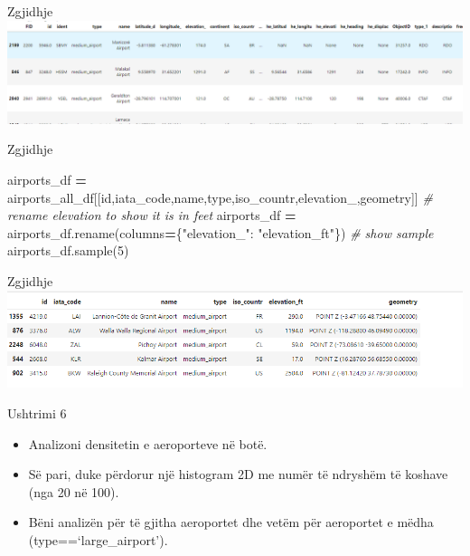 \documentclass[
  ignorenonframetext,
]{beamer}
\newenvironment{Shaded}{\begin{snugshade}}{\end{snugshade}}
\newcommand{\CommentTok}[1]{\textcolor[rgb]{0.56,0.35,0.01}{\textit{#1}}}
\newcommand{\DecValTok}[1]{\textcolor[rgb]{0.00,0.00,0.81}{#1}}
\newcommand{\NormalTok}[1]{#1}
\newcommand{\OperatorTok}[1]{\textcolor[rgb]{0.81,0.36,0.00}{\textbf{#1}}}
\newcommand{\StringTok}[1]{\textcolor[rgb]{0.31,0.60,0.02}{#1}}
\begin{document}
\begin{frame}{Zgjidhje}
\protect\hypertarget{zgjidhje-19}{}
\includegraphics{./Figs/usht5.png}
\end{frame}

\begin{frame}[fragile]{Zgjidhje}
\protect\hypertarget{zgjidhje-20}{}

\begin{Shaded}
\begin{Highlighting}[]
\NormalTok{airports\_df }\OperatorTok{=}\NormalTok{ airports\_all\_df[[}\StringTok{\textquotesingle{}id\textquotesingle{}}\NormalTok{,}\StringTok{\textquotesingle{}iata\_code\textquotesingle{}}\NormalTok{,}\StringTok{\textquotesingle{}name\textquotesingle{}}\NormalTok{,}\StringTok{\textquotesingle{}type\textquotesingle{}}\NormalTok{,}\StringTok{\textquotesingle{}iso\_countr\textquotesingle{}}\NormalTok{,}\StringTok{\textquotesingle{}elevation\_\textquotesingle{}}\NormalTok{,}\StringTok{\textquotesingle{}geometry\textquotesingle{}}\NormalTok{]]}
\CommentTok{\# rename elevation to show it is in feet}
\NormalTok{airports\_df }\OperatorTok{=}\NormalTok{ airports\_df.rename(columns}\OperatorTok{=}\NormalTok{\{}\StringTok{"elevation\_"}\NormalTok{: }\StringTok{"elevation\_ft"}\NormalTok{\})}
\CommentTok{\# show sample}
\NormalTok{airports\_df.sample(}\DecValTok{5}\NormalTok{)}
\end{Highlighting}
\end{Shaded}
\end{frame}

\begin{frame}{Zgjidhje}
\protect\hypertarget{zgjidhje-21}{}
\includegraphics{./Figs/usht51.png}
\end{frame}

\begin{frame}{Ushtrimi 6}
\protect\hypertarget{ushtrimi-6}{}
\begin{itemize}
\item
  Analizoni densitetin e aeroporteve në botë.
\item
  Së pari, duke përdorur një histogram 2D me numër të ndryshëm të
  koshave (nga 20 në 100).
\item
  Bëni analizën për të gjitha aeroportet dhe vetëm për aeroportet e
  mëdha (type==`large\_airport').
\end{itemize}
\end{frame}
\end{document}
